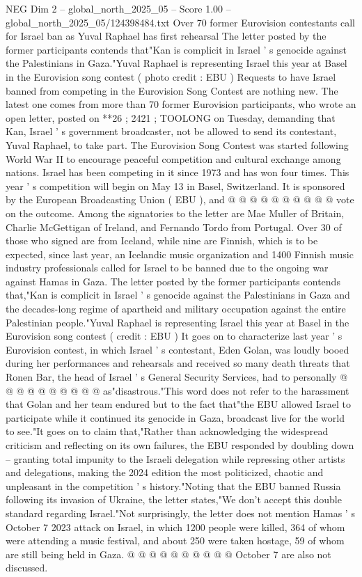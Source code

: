 \begin{textsample}{NEG Dim 2 – global\_north\_2025\_05 – Score 1.00 – global\_north\_2025\_05/124398484.txt}  \label{ex:f2_neg_235}
Over 70 former Eurovision contestants call for Israel ban as Yuval Raphael has first rehearsal The letter posted by the former participants contends that"Kan is complicit in Israel ' s genocide against the Palestinians in Gaza."Yuval Raphael is representing Israel this year at Basel in the Eurovision song contest ( photo credit : EBU ) Requests to have Israel banned from competing in the Eurovision Song Contest are nothing new.
The latest one comes from more than 70 former Eurovision participants, who wrote an open letter, posted on **26 ; 2421 ; TOOLONG on Tuesday, demanding that Kan, Israel ' s government broadcaster, not be allowed to send its contestant, Yuval Raphael, to take part.
The Eurovision Song Contest was started following World War II to encourage peaceful competition and cultural exchange among nations.
Israel has been competing in it since 1973 and has won four times.
This year ' s competition will begin on May 13 in Basel, Switzerland.
It is sponsored by the European Broadcasting Union ( EBU ), and @ @ @ @ @ @ @ @ @ @ vote on the outcome.
Among the signatories to the letter are Mae Muller of Britain, Charlie McGettigan of Ireland, and Fernando Tordo from Portugal.
Over 30 of those who signed are from Iceland, while nine are Finnish, which is to be expected, since last year, an Icelandic music organization and 1400 Finnish music industry professionals called for Israel to be banned due to the ongoing war against Hamas in Gaza.
The letter posted by the former participants contends that,"Kan is complicit in Israel ' s genocide against the Palestinians in Gaza and the decades-long regime of apartheid and military occupation against the entire Palestinian people."Yuval Raphael is representing Israel this year at Basel in the Eurovision song contest ( credit : EBU ) It goes on to characterize last year ' s Eurovision contest, in which Israel ' s contestant, Eden Golan, was loudly booed during her performances and rehearsals and received so many death threats that Ronen Bar, the head of Israel ' s General Security Services, had to personally @ @ @ @ @ @ @ @ @ @ as"disastrous."This word does not refer to the harassment that Golan and her team endured but to the fact that"the EBU allowed Israel to participate while it continued its genocide in Gaza, broadcast live for the world to see."It goes on to claim that,"Rather than acknowledging the widespread criticism and reflecting on its own failures, the EBU responded by doubling down -- granting total impunity to the Israeli delegation while repressing other artists and delegations, making the 2024 edition the most politicized, chaotic and unpleasant in the competition ' s history."Noting that the EBU banned Russia following its invasion of Ukraine, the letter states,"We don't accept this double standard regarding Israel."Not surprisingly, the letter does not mention Hamas ' s October 7 2023 attack on Israel, in which 1200 people were killed, 364 of whom were attending a music festival, and about 250 were taken hostage, 59 of whom are still being held in Gaza. @ @ @ @ @ @ @ @ @ @ October 7 are also not discussed.

\end{textsample}
